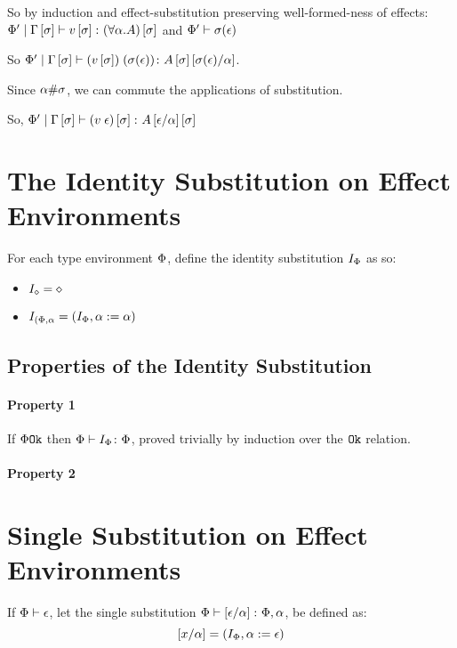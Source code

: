 {    So by induction and effect-substitution preserving well-formed-ness of effects: $\etyperelation{\P'}{\G\ssi}{v\ssi}{(\all{\a}{A})\ssi}$ and $\wellformed{\P'}{\si(\e)}$

    So $\etyperelation{\P'}{\G\ssi}{\eapp{(v\ssi)}{(\si(\e))}}{A\ssi\ssub{\a}{\si(\e)}}$.

    Since $\a\#\si$, we can commute the applications of substitution. 

    So, $\etyperelation{\P'}{\G\ssi}{(\eapp{v}{\e})\ssi}{A\ssub{\a}{\e}\ssi}$

    \section{The Identity Substitution on Effect Environments}
For each type environment $\P$, define the identity substitution $I_{\P}$ as so:

\begin{itemize}
    \item $I_{\nil} = \nil$
    \item $I_{(\P, \a} = (I_{\P}, \a\setto \a)$
\end{itemize}

\subsection{Properties of the Identity Substitution}
\paragraph{Property 1}
If $\ok{\P}$ then $\typerelation{\P}{I_\P}{\P}$, proved trivially by induction over the $\ok{}$ relation.

\paragraph{Property 2}
\section{Single Substitution on Effect Environments}

If $\wellformed{\P}{\e}$, let the single substitution $\typerelation{\P}{\ssub{\a}{\e}}{\P,\a}$, be defined as:
\begin{equation}
    \ssub{\a}{x} = (I_{\P}, \a\setto \e)
\end{equation}



}
